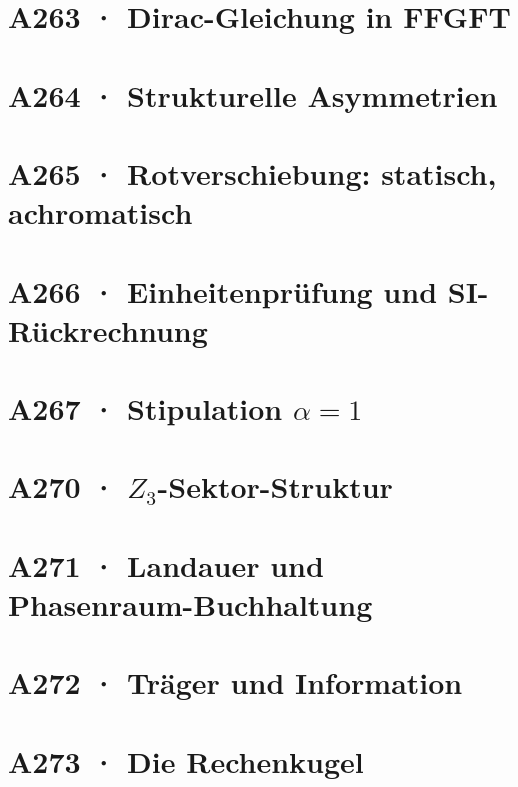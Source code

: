 \documentclass[11pt,twoside,openright]{book}
\begin{document}
\chapter[A263 · Dirac-Gleichung]{A263 · Dirac-Gleichung in FFGFT}


\chapter[A264 · Strukturelle Asymmetrien]{A264 · Strukturelle Asymmetrien}


\chapter[A265 · Rotverschiebung]{A265 · Rotverschiebung: statisch, achromatisch}


\chapter[A266 · Einheitenprüfung]{A266 · Einheitenprüfung und SI-Rückrechnung}


\chapter[A267 · Stipulation $\alpha=1$]{A267 · Stipulation $\alpha=1$}


\chapter[A270 · $Z_3$-Sektor-Struktur]{A270 · $Z_3$-Sektor-Struktur}


\chapter[A271 · Landauer und Phasenraum]{A271 · Landauer und Phasenraum-Buchhaltung}


\chapter[A272 · Träger und Information]{A272 · Träger und Information}


\chapter[A273 · Die Rechenkugel]{A273 · Die Rechenkugel}

\end{document}
